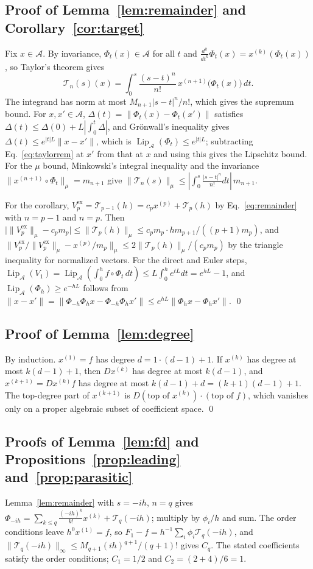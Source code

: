 \documentclass[11pt]{article}
\theoremstyle{definition}
\theoremstyle{remark}
\newcommand{\Aset}{\mathcal{A}}
\newcommand{\Lip}{\operatorname{Lip}_{\Aset}}
\newcommand{\ex}{\mathrm{ex}}
\newcommand{\Rem}{\mathcal{T}}
\begin{document}
\subsection{Proof of Lemma~\ref{lem:remainder} and Corollary~\ref{cor:target}}\label{app:remainder}
Fix $x \in \Aset$.
By invariance, $\Phi_t(x) \in \Aset$ for all $t$ and $\frac{d^k}{dt^k}\Phi_t(x) = x^{(k)}(\Phi_t(x))$, so Taylor's theorem gives
\begin{equation}\label{eq:taylorrem}
\Rem_n(s)(x) = \int_0^s\frac{(s-t)^n}{n!}\,x^{(n+1)}\big(\Phi_t(x)\big)\,dt .
\end{equation}
The integrand has norm at most $M_{n+1}|s-t|^n/n!$, which gives the supremum bound.
For $x,x' \in \Aset$, $\Delta(t) = \|\Phi_t(x) - \Phi_t(x')\|$ satisfies $\Delta(t) \le \Delta(0) + L|\int_0^t\Delta|$, and Gr\"onwall's inequality gives $\Delta(t) \le e^{|t|L}\|x - x'\|$, which is $\Lip(\Phi_t) \le e^{|t|L}$; subtracting Eq.~\eqref{eq:taylorrem} at $x'$ from that at $x$ and using this gives the Lipschitz bound.
For the $\mu$ bound, Minkowski's integral inequality and the invariance $\|x^{(n+1)}\circ\Phi_t\|_\mu = m_{n+1}$ give $\|\Rem_n(s)\|_\mu \le |\int_0^s\frac{|s-t|^n}{n!}dt|\,m_{n+1}$.

For the corollary, $V_p^\ex = \Rem_{p-1}(h) = c_px^{(p)} + \Rem_p(h)$ by Eq.~\eqref{eq:remainder} with $n = p-1$ and $n = p$.
Then $\big|\|V_p^\ex\|_\mu - c_pm_p\big| \le \|\Rem_p(h)\|_\mu \le c_p m_p\cdot hm_{p+1}/((p+1)m_p)$, and $\|V_p^\ex/\|V_p^\ex\|_\mu - x^{(p)}/m_p\|_\mu \le 2\|\Rem_p(h)\|_\mu/(c_pm_p)$ by the triangle inequality for normalized vectors.
For the direct and Euler steps, $\Lip(V_1) = \Lip(\int_0^h f\circ\Phi_t\,dt) \le L\int_0^he^{tL}dt = e^{hL}-1$, and $\Lip(\Phi_h) \ge e^{-hL}$ follows from $\|x - x'\| = \|\Phi_{-h}\Phi_hx - \Phi_{-h}\Phi_hx'\| \le e^{hL}\|\Phi_hx - \Phi_hx'\|$. \qed

\subsection{Proof of Lemma~\ref{lem:degree}}\label{app:degree}
By induction.
$x^{(1)} = f$ has degree $d = 1\cdot(d-1)+1$.
If $x^{(k)}$ has degree at most $k(d-1)+1$, then $Dx^{(k)}$ has degree at most $k(d-1)$, and $x^{(k+1)} = Dx^{(k)}f$ has degree at most $k(d-1) + d = (k+1)(d-1) + 1$.
The top-degree part of $x^{(k+1)}$ is $D(\text{top of }x^{(k)})\cdot(\text{top of }f)$, which vanishes only on a proper algebraic subset of coefficient space. \qed

\subsection{Proofs of Lemma~\ref{lem:fd} and Propositions~\ref{prop:leading} and~\ref{prop:parasitic}}\label{app:slots}
Lemma~\ref{lem:remainder} with $s = -ih$, $n = q$ gives $\Phi_{-ih} = \sum_{k\le q}\frac{(-ih)^k}{k!}x^{(k)} + \Rem_q(-ih)$; multiply by $\phi_i/h$ and sum.
The order conditions leave $h^0x^{(1)} = f$, so $F_1 - f = h^{-1}\sum_i\phi_i\Rem_q(-ih)$, and $\|\Rem_q(-ih)\|_\infty \le M_{q+1}(ih)^{q+1}/(q+1)!$ gives $C_q$.
The stated coefficients satisfy the order conditions; $C_1 = 1/2$ and $C_2 = (2 + 4)/6 = 1$.
\end{document}
